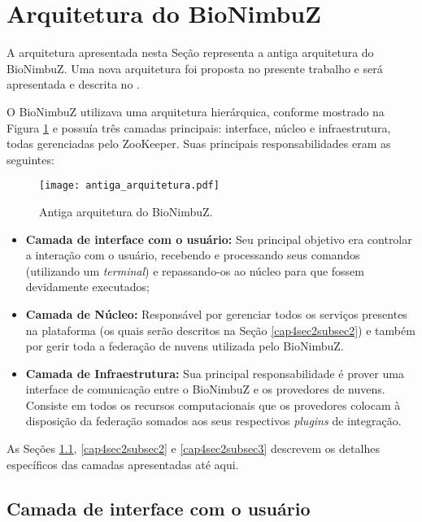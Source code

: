 \section{Arquitetura do BioNimbuZ} \label{cap4sec2}

A arquitetura apresentada nesta Seção representa a antiga arquitetura do BioNimbuZ. Uma nova arquitetura foi proposta no presente trabalho e será apresentada e descrita no . 

O BioNimbuZ utilizava uma arquitetura hierárquica, conforme mostrado na Figura \ref{fig:antiga_arquitetura} e possuía três camadas principais: interface, núcleo e infraestrutura, todas gerenciadas pelo ZooKeeper. Suas principais responsabilidades eram as seguintes:

\begin{figure}[H]
	\centering
	\texttt{[image: antiga\_arquitetura.pdf]}
	\caption{Antiga arquitetura do BioNimbuZ.}
	\label{fig:antiga_arquitetura}
\end{figure}

\begin{itemize}
	\item \textbf{Camada de interface com o usuário:} Seu principal objetivo era controlar a interação com o usuário, recebendo e processando seus comandos (utilizando um \textit{terminal}) e repassando-os ao núcleo para que fossem devidamente executados;
    \item \textbf{Camada de Núcleo:} Responsável por gerenciar todos os serviços presentes na plataforma (os quais serão descritos na Seção \ref{cap4sec2subsec2}) e também por gerir toda a federação de nuvens utilizada pelo BioNimbuZ.
    \item \textbf{Camada de Infraestrutura:} Sua principal responsabilidade é prover uma interface de comunicação entre o BioNimbuZ e os provedores de nuvens. Consiste em todos os recursos computacionais que os provedores colocam à disposição da federação somados aos seus respectivos \textit{plugins} de integração.
\end{itemize}

As Seções \ref{cap4sec2subsec1}, \ref{cap4sec2subsec2} e \ref{cap4sec2subsec3} descrevem os detalhes específicos das camadas apresentadas até aqui.

\subsection{Camada de interface com o usuário} \label{cap4sec2subsec1}

